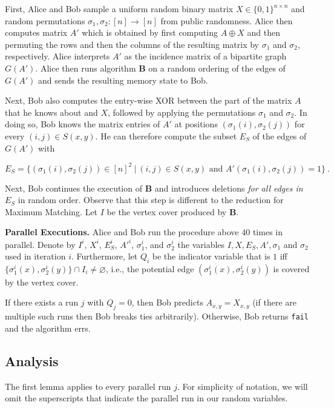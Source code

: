 \documentclass[10pt,a4paper]{article}
\begin{document}
First, Alice and Bob sample a uniform random binary matrix $X \in \{0,1\}^{n \times n}$ and random permutations 
$\sigma_1, \sigma_2: [n] \rightarrow [n]$ from public randomness. 
Alice then computes matrix $A'$ which is obtained by first computing $A \oplus X$
and then  permuting the rows and then the columns of the resulting matrix by $\sigma_1$ and $\sigma_2$, respectively. 
Alice interprets $A'$ as the incidence matrix of a bipartite graph $G(A')$. Alice then runs algorithm $\mathbf{B}$ 
on a random ordering of the edges of $G(A')$ and sends the resulting memory state to Bob.

Next, Bob also computes the entry-wise XOR between the part of the matrix $A$ that he knows about and $X$, followed by applying
the permutations $\sigma_1$ and $\sigma_2$. In doing so, Bob knows the matrix entries of $A'$ at positions 
$(\sigma_1(i), \sigma_2(j))$
for every $(i,j) \in S(x,y)$. He can therefore compute the subset $E_S$ of the edges of $G(A')$ with

$$E_S = \{(\sigma_1(i),\sigma_2(j)) \in [n]^2 \ | \ (i,j) \in S(x,y) \mbox{ and } A'(\sigma_1(i),\sigma_2(j)) = 1  \} \ .$$

Next, Bob continues the execution of $\mathbf{B}$ and introduces deletions {\em for all edges in $E_S$} in random order. 
Observe that this 
step is different to the reduction for \textsf{Maximum Matching}. Let $I$ be the vertex cover produced by $\mathbf{B}$.
%

\textbf{Parallel Executions.} Alice and Bob run the procedure above $40$ times in parallel. Denote by $I^i$, $X^i$, $E^i_S$,
$A'^i$, $\sigma_1^i$, and $\sigma_2^i$ the variables $I, X, E_S, A', \sigma_1$ and $\sigma_2$ used in iteration $i$.  
Furthermore, let $Q_i$ be 
the indicator variable that is $1$ iff $\{ \sigma^i_1(x), \sigma^i_2(y) \} \cap I_i \neq \varnothing$,
i.e., the potential edge $(\sigma^i_1(x), \sigma^i_2(y))$ is covered by the vertex cover. 

If there exists a run $j$ with $Q_j = 0$, then Bob predicts $A_{x,y} = X_{x,y}$ (if there are multiple such runs
then Bob breaks ties arbitrarily). Otherwise, Bob returns \texttt{fail} and the algorithm errs.

\subsection{Analysis}
%
%
%
%
%
%

The first lemma applies to every parallel run $j$. For simplicity of notation, we will omit
the superscripts that indicate the parallel run in our random variables.
\end{document}
